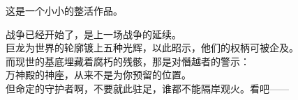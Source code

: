 
\linespread{1.1}

\setmainfont[AutoFakeSlant]{PingFang SC}



\newcommand{\voiceline}[1]{
    \\{\footnotesize\itshape 台词：#1}
}
\newcommand{\charskillprop}[2]{
    \vspace{7pt}%
    \hrule width 0.7\linewidth
    \vspace{7pt}%
    {\normalsize$\blacksquare$ #1}\\%
    \small#2\par
}
\newcommand{\charprofile}[3]{
    \fbox{
        \begin{minipage}{0.7\linewidth}
            \vspace{10pt}%
            {\Large\bfseries#1}\hfill{\small#2}\par
            \vspace{6pt}
            #3\par
            \vspace{10pt}%
        \end{minipage}
    }
}
\newcommand{\tobecontinued}[0]{
    \clearpage\hspace{0.5\linewidth}\vspace{0.42\textheight}\par%
    \begin{minipage}{\linewidth}
        \center%
        以下为草稿
    \end{minipage}
    \clearpage
}






\fulldoctitle

这是一个小小的整活作品。

{\Nmaketoc}\clearpage



战争已经开始了，是上一场战争的延续。\\
巨龙为世界的轮廓镀上五种光辉，以此昭示，他们的权柄可被企及。\\
而现世的基底埋藏着腐朽的残骸，那是对僭越者的警示：\\
万神殿的神座，从来不是为你预留的位置。\\
但命定的守护者啊，不要就此驻足，谁都不能隔岸观火。看吧——

